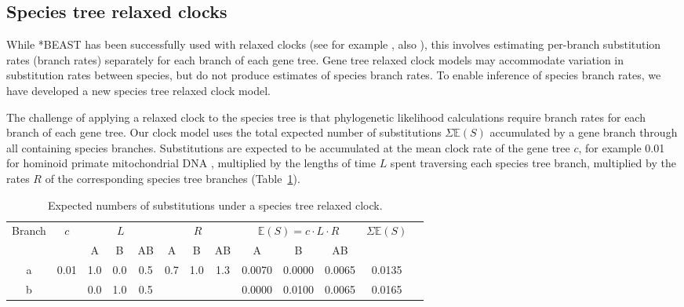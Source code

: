 \documentclass[12pt]{article}
\begin{document}
\subsection*{Species tree relaxed clocks}

While *BEAST has been successfully used with relaxed clocks
(see for example \cite{Berv2014120}, also \cite{Lambert2015146}), this involves estimating per-branch
substitution rates (branch rates) separately for each branch of each gene tree.
Gene tree relaxed clock models may accommodate variation in substitution rates
between species, but do not produce estimates of species branch rates. To enable
inference of species branch rates, we have developed a new species tree relaxed
clock model.

The challenge of applying a relaxed clock to the species tree is that
phylogenetic likelihood calculations require branch rates for each branch of
each gene tree. Our clock model uses the total expected number of substitutions
$\Sigma \mathbb{E}(S)$ accumulated by a gene branch through all containing
species branches. Substitutions are expected to be accumulated at the mean
clock rate of the gene tree $c$, for example 0.01 for hominoid primate
mitochondrial DNA \citep{doi:10.1146/annurev.es.18.110187.001413}, multiplied
by the lengths of time $L$ spent traversing each species tree branch, multiplied
by the rates $R$ of the corresponding species tree branches
(Table~\ref{tab:branchRateModel}).

\begin{table}[htb!]
\centering
\caption{Expected numbers of substitutions under a species tree relaxed clock.}
\label{tab:branchRateModel}
\begin{threeparttable}
\begin{adjustbox}{center}
\begin{tabular}{|c|c|c|c|c|c|c|c|c|c|c|c|c|}
\hline
\multirow{2}{*}{Branch} & \multirow{2}{*}{$c$} & \multicolumn{3}{c|}{$L$} & \multicolumn{3}{c|}{$R$} & \multicolumn{3}{c|}{$\mathbb{E}(S) = c\cdot L\cdot R$} & \multirow{2}{*}{$\Sigma \mathbb{E}(S)$}\tabularnewline
\cline{3-11}
 & & A & B & AB & A & B & AB & A & B & AB & \tabularnewline
\hline
a & \multirow{2}{*}{0.01} & 1.0 & 0.0 & 0.5 & \multirow{2}{*}{0.7} & \multirow{2}{*}{1.0} & \multirow{2}{*}{1.3} & 0.0070 & 0.0000 & 0.0065 & 0.0135\tabularnewline
\cline{1-1} \cline{3-5} \cline{9-12}
b & & 0.0 & 1.0 & 0.5 & & & & 0.0000 & 0.0100 & 0.0065 & 0.0165\tabularnewline
\hline
\end{tabular}
\end{adjustbox}
\end{threeparttable}
\end{table}
\end{document}
